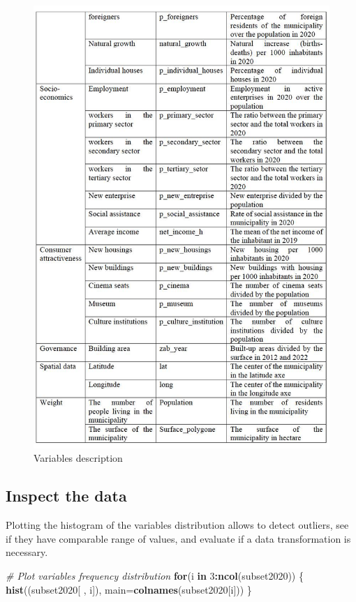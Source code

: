 \documentclass[
]{book}
\newenvironment{Shaded}{\begin{snugshade}}{\end{snugshade}}
\newcommand{\AttributeTok}[1]{\textcolor[rgb]{0.13,0.29,0.53}{#1}}
\newcommand{\CommentTok}[1]{\textcolor[rgb]{0.56,0.35,0.01}{\textit{#1}}}
\newcommand{\ControlFlowTok}[1]{\textcolor[rgb]{0.13,0.29,0.53}{\textbf{#1}}}
\newcommand{\DecValTok}[1]{\textcolor[rgb]{0.00,0.00,0.81}{#1}}
\newcommand{\FunctionTok}[1]{\textcolor[rgb]{0.13,0.29,0.53}{\textbf{#1}}}
\newcommand{\NormalTok}[1]{#1}
\newcommand{\SpecialCharTok}[1]{\textcolor[rgb]{0.81,0.36,0.00}{\textbf{#1}}}
\begin{document}
\begin{figure}
\includegraphics[width=1\linewidth,height=1\textheight]{images/Variables2} \caption{Variables description \label{Variables}}\label{fig:variables-2}
\end{figure}

\hypertarget{inspect-the-data}{%
\subsection{Inspect the data}\label{inspect-the-data}}

Plotting the histogram of the variables distribution allows to detect outliers, see if they have comparable range of values, and evaluate if a data transformation is necessary.

\begin{Shaded}
\begin{Highlighting}[]
\CommentTok{\# Plot variables\textquotesingle{} frequency distribution}
\ControlFlowTok{for}\NormalTok{(i }\ControlFlowTok{in} \DecValTok{3}\SpecialCharTok{:}\FunctionTok{ncol}\NormalTok{(subset2020)) \{      }
    \FunctionTok{hist}\NormalTok{((subset2020[ , i]),  }\AttributeTok{main=}\FunctionTok{colnames}\NormalTok{(subset2020[i]))}
\NormalTok{\}}
\end{Highlighting}
\end{Shaded}
\end{document}
